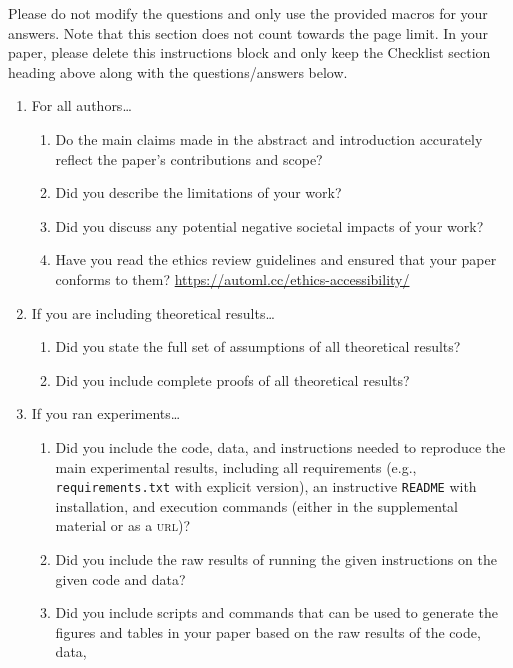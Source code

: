 \documentclass[11pt]{article}
\begin{document}
Please do not modify the questions and only use the provided macros for your
answers. Note that this section does not count towards the page limit. In your
paper, please delete this instructions block and only keep the Checklist section
heading above along with the questions/answers below.
\begin{enumerate}
\item For all authors\dots
  \begin{enumerate}
  \item Do the main claims made in the abstract and introduction accurately
    reflect the paper's contributions and scope?
    \answerTODO{}
  \item Did you describe the limitations of your work?
    \answerTODO{}
  \item Did you discuss any potential negative societal impacts of your work?
    \answerTODO{}
  \item Have you read the ethics review guidelines and ensured that your paper
    conforms to them? \url{https://automl.cc/ethics-accessibility/}
    \answerTODO{}
  \end{enumerate}
\item If you are including theoretical results\dots
  \begin{enumerate}
  \item Did you state the full set of assumptions of all theoretical results?
    \answerTODO{}
  \item Did you include complete proofs of all theoretical results?
    \answerTODO{}
  \end{enumerate}
\item If you ran experiments\dots
  \begin{enumerate}
  \item Did you include the code, data, and instructions needed to reproduce the
    main experimental results, including all requirements (e.g.,
    \texttt{requirements.txt} with explicit version), an instructive
    \texttt{README} with installation, and execution commands (either in the
    supplemental material or as a \textsc{url})?
    \answerTODO{}
  \item Did you include the raw results of running the given instructions on the
    given code and data?
    \answerTODO{}
  \item Did you include scripts and commands that can be used to generate the
    figures and tables in your paper based on the raw results of the code, data,

\end{enumerate}
\end{enumerate}
\end{document}
